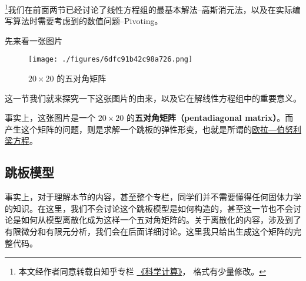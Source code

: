 

\footnote{本文经作者同意转载自知乎专栏 \href{https://www.zhihu.com/column/c_1226443594048942080}{《科学计算》}， 格式有少量修改。}我们在前面两节已经讨论了线性方程组的最基本解法--高斯消元法，以及在实际编写算法时需要考虑到的数值问题--Pivoting。

先来看一张图片
\begin{figure}[ht]
\centering
\texttt{[image: ./figures/6dfc91b42c98a726.png]}
\caption{$20\times 20$ 的五对角矩阵} \label{fig_NLinE3_1}
\end{figure}
这一节我们就来探究一下这张图片的由来，以及它在解线性方程组中的重要意义。

事实上，这张图片是一个 $20\times20$  的\textbf{五对角矩阵（pentadiagonal matrix）}。而产生这个矩阵的问题，则是求解一个跳板的弹性形变，也就是所谓的\href{https://en.wikipedia.org/wiki/Euler\%E2\%80\%93Bernoulli_beam_theory}{欧拉—伯努利梁方程}。

\subsection{跳板模型}

事实上，对于理解本节的内容，甚至整个专栏，同学们并不需要懂得任何固体力学的知识。在这里，我们不会讨论这个跳板模型是如何构造的，甚至这一节也不会讨论是如何从模型离散化成为这样一个五对角矩阵的。关于离散化的内容，涉及到了有限微分和有限元分析，我们会在后面详细讨论。这里我只给出生成这个矩阵的完整代码。

